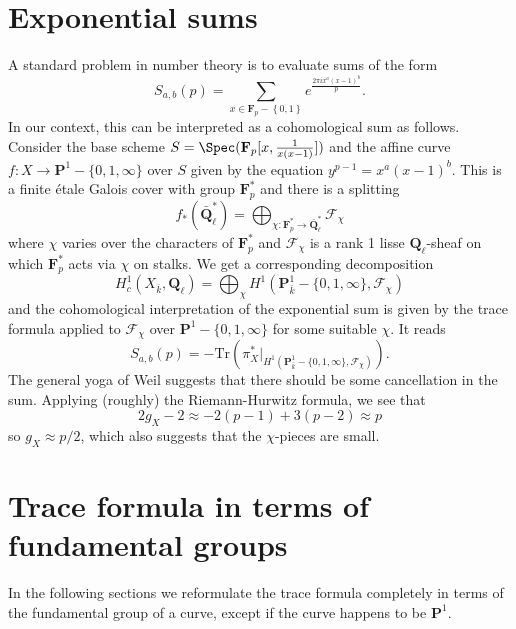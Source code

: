 \section{Exponential sums}
\label{trace-section-exponential-sums}
A standard problem in number theory is to evaluate sums of the form
$$
S_{a, b}(p) = \sum_{x\in \mathbf{F}_p - \left\{0, 1\right\}} e^{\frac{2\pi
ix^a(x - 1)^b}{p}}.
$$
In our context, this can be interpreted as a cohomological sum as follows.
Consider the base scheme
$S = \Spec(\mathbf{F}_p[x, \frac{1}{x(x - 1)}])$ and the affine curve
$f : X \to \mathbf{P}^1-\{0, 1, \infty\}$ over $S$ given by the equation
$y^{p - 1} = x^a(x - 1)^b$. This is a finite \'etale Galois cover with group
$\mathbf{F}_p^*$ and there is a splitting
$$
f_*(\bar{\mathbf{Q}}_\ell^*) =
\bigoplus_{\chi : \mathbf{F}_p^*\to \bar{\mathbf{Q}}_\ell^*} \mathcal{F}_\chi
$$
where $\chi$ varies over the characters of $\mathbf{F}_p^*$ and
$\mathcal{F}_\chi$ is a rank 1 lisse $\mathbf{Q}_\ell$-sheaf on which
$\mathbf{F}_p^*$ acts via $\chi$ on stalks. We get a corresponding decomposition
$$
H_c^1(X_{\bar k}, \mathbf{Q}_\ell) = \bigoplus_\chi H^1(\mathbf{P}_{\bar
k}^1-\{0, 1, \infty\}, \mathcal{F}_\chi)
$$
and the cohomological interpretation of the exponential sum is given by the
trace formula applied to $\mathcal{F}_\chi$ over $\mathbf{P}^1 - \{0, 1,
\infty\}$ for some suitable $\chi$. It reads
$$
S_{a, b}(p) =
-\text{Tr}(\pi_X^*
|_{H^1(\mathbf{P}_{\bar k}^1-\{0, 1, \infty\}, \mathcal{F}_\chi)}).
$$
The general yoga of Weil suggests that there should be some cancellation in the
sum. Applying (roughly) the Riemann-Hurwitz formula, we see that
$$
2g_X-2 \approx -2 (p-1) + 3(p-2) \approx p
$$
so $g_X\approx p/2$, which also suggests that the $\chi$-pieces are small.



\section{Trace formula in terms of fundamental groups}
\label{trace-section-trace-formula-fundamental-group}
In the following sections we reformulate the trace formula completely
in terms of the fundamental group of a curve, except if the curve
happens to be $\mathbf{P}^1$.

